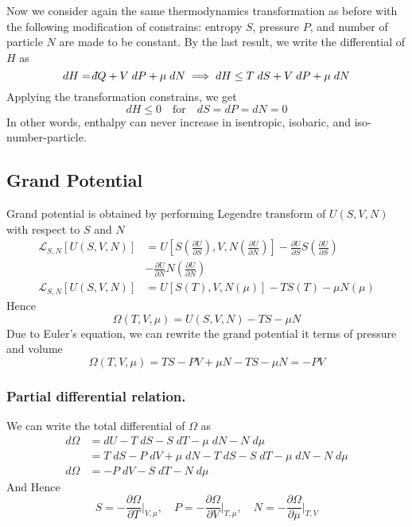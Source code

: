\documentclass[../../../Main.tex]{subfiles}
\begin{document}
Now we consider again the same thermodynamics transformation as before with the following modification of constrains: entropy $S$, pressure $P$, and number of particle $N$ are made to be constant. By the last result, we write the differential of $H$ as 
\begin{equation*}
    dH=\dbar Q+V\;dP+\mu\;dN\implies dH\leq T\;dS+V\;dP+\mu\;dN
\end{equation*}
Applying the transformation constrains, we get 
\begin{equation*}
    dH\leq 0 \quad\text{for}\quad dS=dP=dN=0
\end{equation*}
In other words, enthalpy can never increase in isentropic, isobaric, and iso-number-particle.

\subsection*{Grand Potential}
Grand potential is obtained by performing Legendre transform of $U(S,V,N)$ with respect to $S$ and $N$
\begin{align*}
    \mathcal{L}_{S,N}\left[U(S,V,N)\right]&= U\left[S\left(\frac{\partial U}{\partial S}\right),V,N\left(\frac{\partial U}{\partial N}\right)\right] - \frac{\partial U}{\partial S}S\left(\frac{\partial U}{\partial S}\right)\\
    &- \frac{\partial U}{\partial N}N\left(\frac{\partial U}{\partial N}\right) \\
    \mathcal{L}_{S,N}\left[U(S,V,N)\right]&=U\left[S(T),V,N(\mu)\right]- TS(T)-\mu N(\mu)
\end{align*}
Hence
\begin{equation*}
    \Omega(T,V,\mu)=U(S,V,N)-TS-\mu N
\end{equation*}
Due to Euler's equation, we can rewrite the grand potential it terms of pressure and volume
\begin{equation*}
    \Omega(T,V,\mu)=TS-PV+\mu N-TS-\mu N=-PV
\end{equation*}

\subsubsection*{Partial differential relation.} We can write the total differential of $\Omega$ as 
\begin{align*}
    d\Omega&= dU-T\;dS- S\;dT-\mu \;dN-N\;d\mu\\
    &=T\;dS-P\;dV+\mu\;dN-T\;dS- S\;dT-\mu \;dN-N\;d\mu\\
    d\Omega&=-P\;dV-S\;dT-N\;d\mu
\end{align*}
And Hence 
\begin{equation*}
    S=-\frac{\partial \Omega}{\partial T}\bigg|_{V,\mu},\quad P=-\frac{\partial \Omega}{\partial V}\bigg|_{T,\mu},\quad N=-\frac{\partial \Omega}{\partial \mu}\bigg|_{T,V}
\end{equation*}
\end{document}
